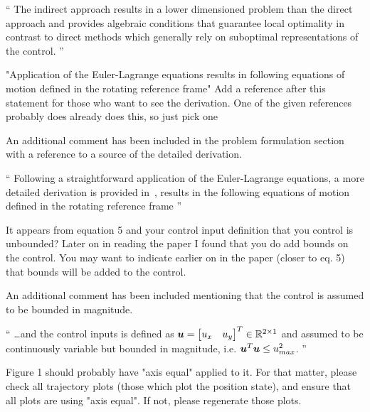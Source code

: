 \documentclass[11pt]{article}
\newenvironment{correction}{\begin{list}{}{\setlength{\leftmargin}{1cm}\setlength{\rightmargin}{1cm}}\vspace{\parsep}\item[]``}{''\end{list}}
\begin{document}
\begin{enumerate}
\begin{correction}
The indirect approach results in a lower dimensioned problem than the direct approach and provides algebraic conditions that guarantee local optimality in contrast to direct methods which generally rely on suboptimal representations of the control.
\end{correction}
\item 
    \begin{itshape}
"Application of the Euler-Lagrange equations results in following equations of motion defined in the rotating reference frame"  Add a reference after this statement for those who want to see the derivation.  One of the given references probably does already does this, so just pick one
\end{itshape}

An additional comment has been included in the problem formulation section with a reference to a source of the detailed derivation.
\begin{correction}
Following a straightforward application of the Euler-Lagrange equations, a more detailed derivation is provided in~\cite{szebehely1967}, results in the following equations of motion defined in the rotating reference frame
\end{correction}

\item 
    \begin{itshape}
It appears from equation 5 and your control input definition that you control is unbounded?  Later on in reading the paper I found that you do add bounds on the control.  You may want to indicate earlier on in the paper (closer to eq. 5) that bounds will be added to the control.
\end{itshape}

An additional comment has been included mentioning that the control is assumed to be bounded in magnitude.

\begin{correction}
\ldots and the control inputs is defined as \( \bm{u} = \begin{bmatrix} u_x & u_y \end{bmatrix}^T \in \mathbb{R}^{2\times1} \) and assumed to be continuously variable but bounded in magnitude, i.e. \( \bm{u}^T \bm{u} \leq u_{max}^2 \).
\end{correction}

\item 
    \begin{itshape}
Figure 1 should probably have "axis equal" applied to it.  For that matter, please check all trajectory plots (those which plot the position state), and ensure that all plots are using "axis equal".  If not, please regenerate those plots. 
\end{itshape}


\end{enumerate}
\end{document}
